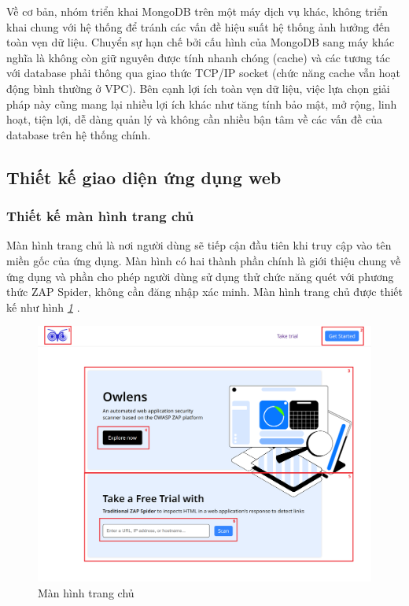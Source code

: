 Về cơ bản, nhóm triển khai MongoDB trên một máy dịch vụ khác, không triển khai chung với hệ thống để tránh các vấn đề hiệu suất hệ thống ảnh hưởng đến toàn vẹn dữ liệu.
Chuyển sự hạn chế bởi cấu hình của MongoDB sang máy khác nghĩa là không còn giữ nguyên được tính nhanh chóng (cache) và các tương tác với database phải thông qua giao thức TCP/IP socket (chức năng cache vẫn hoạt động bình thường ở VPC).
Bên cạnh lợi ích toàn vẹn dữ liệu, việc lựa chọn giải pháp này cũng mang lại nhiều lợi ích khác như tăng tính bảo mật, mở rộng, linh hoạt, tiện lợi, dễ dàng quản lý và không cần nhiều bận tâm về các vấn đề của database trên hệ thống chính.

\newpage
\subsection{Thiết kế giao diện ứng dụng web}

\subsubsection{Thiết kế màn hình trang chủ}

\tab Màn hình trang chủ là nơi người dùng sẽ tiếp cận đầu tiên khi truy cập vào tên miền gốc của ứng dụng.
Màn hình có hai thành phần chính là giới thiệu chung về ứng dụng và phần cho phép người dùng sử dụng thử chức năng quét với phương thức ZAP Spider, không cần đăng nhập xác minh.
Màn hình trang chủ được thiết kế như hình \textit{\ref{fig:MHTrangChu} }.

\begin{figure}[H]
      \centering
      \includegraphics[width=\textwidth]{applied-thesis-chapters/chapter-3/Màn hình trang chủ.png}
      \caption{Màn hình trang chủ}
      \label{fig:MHTrangChu}
\end{figure}

